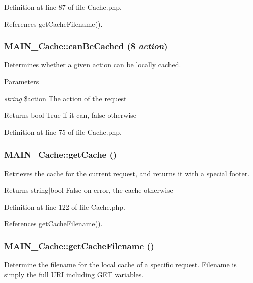 Definition at line 87 of file Cache.php.

References getCacheFilename().\hypertarget{classMAIN__Cache_a18001a7118a190476c4ad391f09bc7c1}{
\subsubsection[{canBeCached}]{\setlength{\rightskip}{0pt plus 5cm}MAIN\_\-Cache::canBeCached (\$ {\em action})}}
\label{d2/d41/classMAIN__Cache_a18001a7118a190476c4ad391f09bc7c1}
Determines whether a given action can be locally cached.


\begin{DoxyParams}{Parameters}
\item[{\em string}]\$action The action of the request\end{DoxyParams}
\begin{DoxyReturn}{Returns}
bool True if it can, false otherwise 
\end{DoxyReturn}


Definition at line 75 of file Cache.php.\hypertarget{classMAIN__Cache_a3e92222db37430da9ee40d4ec7263e21}{
\subsubsection[{getCache}]{\setlength{\rightskip}{0pt plus 5cm}MAIN\_\-Cache::getCache ()}}
\label{d2/d41/classMAIN__Cache_a3e92222db37430da9ee40d4ec7263e21}
Retrieves the cache for the current request, and returns it with a special footer.

\begin{DoxyReturn}{Returns}
string$|$bool False on error, the cache otherwise 
\end{DoxyReturn}


Definition at line 122 of file Cache.php.

References getCacheFilename().\hypertarget{classMAIN__Cache_a033ba2adab9e0fed859f88368506c9a1}{
\subsubsection[{getCacheFilename}]{\setlength{\rightskip}{0pt plus 5cm}MAIN\_\-Cache::getCacheFilename ()}}
\label{d2/d41/classMAIN__Cache_a033ba2adab9e0fed859f88368506c9a1}
Determine the filename for the local cache of a specific request. Filename is simply the full URI including GET variables.

